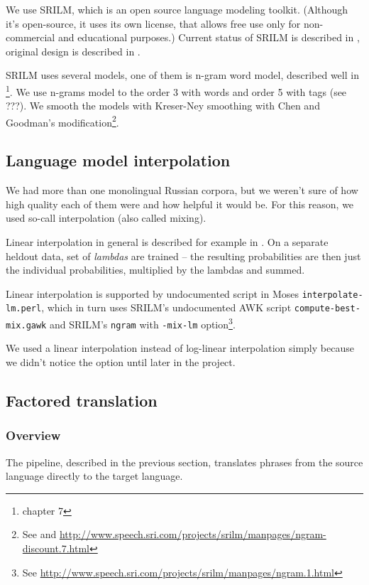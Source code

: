 We use SRILM, which is an open source language modeling toolkit. (Although it's open-source, it uses its own license, that allows free use only for non-commercial and educational purposes.) Current status of SRILM is described in \cite{srilm}, original design is described in \cite{srilm_old}. 

SRILM uses several models, one of them is n-gram word model, described well in \cite{koehn2010statistical}\footnote{chapter 7}. We use n-grams model to the order 3 with words and order 5 with tags (see ???). We smooth the models with Kreser-Ney smoothing with Chen and Goodman's modification\footnote{See \cite{chen} and \url{http://www.speech.sri.com/projects/srilm/manpages/ngram-discount.7.html}}. 


\subsection{Language model interpolation}

We had more than one monolingual Russian corpora, but we weren't sure of how high quality each of them were and how helpful it would be. For this reason, we used so-call interpolation (also called mixing).

Linear interpolation in general is described for example in \cite{gutkin}. On a separate heldout data, set of \emph{lambdas} are trained -- the resulting probabilities are then just the individual probabilities, multiplied by the lambdas and summed.

Linear interpolation is supported by undocumented script in Moses \texttt{interpolate-lm.perl}, which in turn uses SRILM's undocumented AWK script \texttt{compute-best-mix.gawk} and SRILM's \texttt{ngram} with \texttt{-mix-lm} option\footnote{See \url{http://www.speech.sri.com/projects/srilm/manpages/ngram.1.html}}.

We used a linear interpolation instead of log-linear interpolation simply because we didn't notice the option until later in the project.

\subsection{Factored translation}
\subsubsection{Overview}

The pipeline, described in the previous section, translates phrases from the source language directly to the target language.


